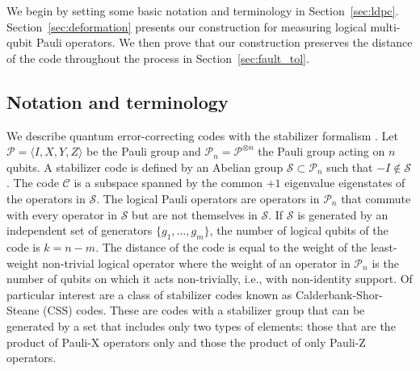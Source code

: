\documentclass[reprint,
superscriptaddress,
 amsmath,amssymb,
 aps, longbibliography
]{revtex4-1}
\newcommand{\rev}[1]{{#1}}
\begin{document}
We begin by setting some basic notation and terminology in Section~\ref{sec:ldpc}.  Section~\ref{sec:deformation} presents our construction for measuring logical multi-qubit Pauli operators. We then prove that our construction preserves the distance of the code throughout the process in Section~\ref{sec:fault_tol}.

\subsection{\label{sec:ldpc}Notation and terminology}

We describe quantum error-correcting codes with the stabilizer formalism%
. Let $\mathcal{P} = \langle I, X, Y, Z\rangle $ be the Pauli group and $\mathcal{P}_n = \mathcal{P}^{\otimes n}$ the Pauli group acting on $n$ qubits.  A stabilizer code is defined by an Abelian group $\mathcal{S} \subset \mathcal{P}_n$ such that $-I \not\in \mathcal{S}$. 
The code $\mathcal{C}$ is a subspace spanned by the common $+1$ eigenvalue eigenstates of the operators in $\mathcal{S}$. The logical Pauli operators are operators in $\mathcal{P}_n$ that commute with every operator in $\mathcal{S}$ but are not themselves in $\mathcal{S}$. If $\mathcal{S}$ is generated by an independent set of generators $\{ g_1, \ldots, g_m\}$, the number of logical qubits of the code is $k=n-m$. The distance of the code is equal to the weight of the least-weight non-trivial logical operator where the weight of an operator in $\mathcal{P}_n$ is the number of qubits on which it acts non-trivially, i.e., with non-identity support. Of particular interest are a class of stabilizer codes known as Calderbank-Shor-Steane (CSS) codes. These are codes with a stabilizer group that can be generated by a set that includes only two types of elements: those that are the product of Pauli-X operators only and those the product of only Pauli-Z operators.

\end{document}
